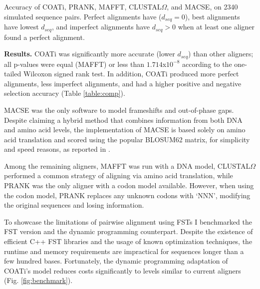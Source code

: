 \begin{table}[!ht]
\centering
    \frame{}
	\caption{Accuracy of COATi, PRANK, MAFFT, CLUSTAL$\Omega$, and MACSE,
            on 2340 simulated sequence pairs. Perfect alignments have
            ($d_{seq}=0$), best alignments have lowest $d_{seq}$, and imperfect
            alignments have $d_{seq}>0$ when at least one aligner found a
            perfect alignment.}
	\label{table:comp}
\end{table}

\textbf{Results.}
COATi was significantly more accurate (lower $d_{seq}$) than other aligners; all
p-values were equal (MAFFT) or less than $1.714$x$10^{-8}$ according to the one-tailed
Wilcoxon signed rank test.
In addition, COATi produced more perfect alignments, less imperfect alignments,
and had a higher positive and negative selection accuracy
(Table \ref{table:comp}).

MACSE was the only software to model frameshifts and out-of-phase gaps.
Despite claiming a hybrid method that combines information from both DNA and
amino acid levels, the implementation of MACSE is based solely on amino acid
translation and scored using the popular BLOSUM62 \parencite{henikoff1992amino}
matrix, for simplicity and speed reasons, as reported in
\cite{ranwez_macse_2011}.

Among the remaining aligners, MAFFT was run with a DNA model, CLUSTAL$\Omega$
performed a common strategy of aligning via amino acid translation, while PRANK
was the only aligner with a codon model available.
However, when using the codon model, PRANK replaces any unknown codons with
`NNN', modifying the original sequences and losing information.


To showcase the limitations of pairwise alignment using FSTs I benchmarked
the FST version and the dynamic programming counterpart.
Despite the existence of efficient C++ FST libraries and the usage of known
optimization techniques, the runtime and memory requirements are impractical
for sequences longer than a few hundred bases.
Fortunately, the dynamic programming adaptation of COATi's model
reduces costs significantly to levels similar to current aligners
(Fig. \ref{fig:benchmark}).

